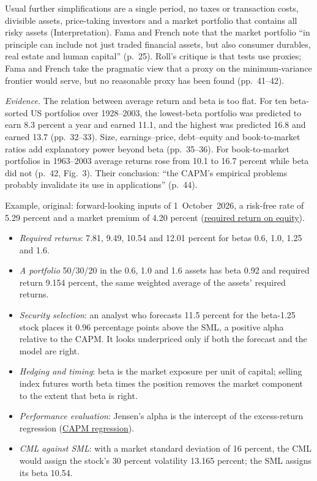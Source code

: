 \begin{qfmodel}
 Usual further simplifications are a single period, no taxes or transaction costs, divisible assets, price-taking investors and a market portfolio that contains all risky assets (Interpretation). Fama and French note that the market portfolio ``in principle can include not just traded financial assets, but also consumer durables, real estate and human capital'' (p.~25). Roll's critique is that tests use proxies; Fama and French take the pragmatic view that a proxy on the minimum-variance frontier would serve, but no reasonable proxy has been found (pp.~41--42).

\emph{Evidence.} The relation between average return and beta is too flat. For ten beta-sorted US portfolios over 1928--2003, the lowest-beta portfolio was predicted to earn 8.3 percent a year and earned 11.1, and the highest was predicted 16.8 and earned 13.7 (pp.~32--33). Size, earnings--price, debt--equity and book-to-market ratios add explanatory power beyond beta (pp.~35--36). For book-to-market portfolios in 1963--2003 average returns rose from 10.1 to 16.7 percent while beta did not (p.~42, Fig.~3). Their conclusion: ``the CAPM's empirical problems probably invalidate its use in applications'' (p.~44).

 Example, original: forward-looking inputs of 1~October~2026, a risk-free rate of 5.29 percent and a market premium of 4.20 percent (\hyperref[meth:required-return-on-equity]{required return on equity}).
\begin{itemize}
\item \emph{Required returns}: 7.81, 9.49, 10.54 and 12.01 percent for betas 0.6, 1.0, 1.25 and 1.6.
\item \emph{A portfolio} 50/30/20 in the 0.6, 1.0 and 1.6 assets has beta 0.92 and required return 9.154 percent, the same weighted average of the assets' required returns.
\item \emph{Security selection}: an analyst who forecasts 11.5 percent for the beta-1.25 stock places it 0.96 percentage points above the SML, a positive alpha relative to the CAPM. It looks underpriced only if both the forecast and the model are right.
\item \emph{Hedging and timing}: beta is the market exposure per unit of capital; selling index futures worth beta times the position removes the market component to the extent that beta is right.
\item \emph{Performance evaluation}: Jensen's alpha is the intercept of the excess-return regression (\hyperref[meth:capm-regression]{CAPM regression}).
\item \emph{CML against SML}: with a market standard deviation of 16 percent, the CML would assign the stock's 30 percent volatility 13.165 percent; the SML assigns its beta 10.54.
\end{itemize}


\end{qfmodel}
